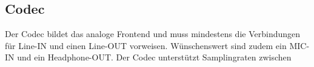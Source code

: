 \subsection{Codec}
\label{subsec:Konzept_Codec}

Der Codec bildet das analoge Frontend und muss mindestens die Verbindungen für Line-IN und einen Line-OUT vorweisen.
Wünschenswert sind zudem ein MIC-IN und ein Headphone-OUT.
Der Codec unterstützt Samplingraten zwischen 



